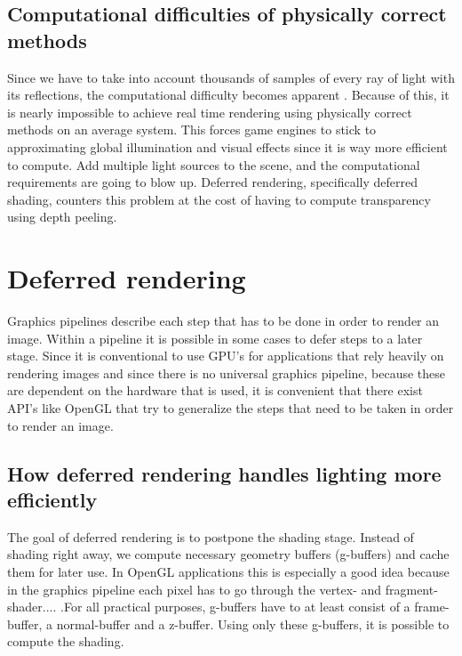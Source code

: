 \documentclass{ACGSeminar}
\begin{document}
	\subsection{Computational difficulties of physically correct methods}
	Since we have to take into account thousands of samples of every ray of light with its reflections, the computational difficulty becomes apparent \cite{DST}. Because of this, it is nearly impossible to achieve real time rendering using physically correct methods on an average system. This forces game engines to stick to approximating global illumination and visual effects since it is way more efficient to compute. Add multiple light sources to the scene, and the computational requirements are going to blow up. Deferred rendering, specifically deferred shading, counters this problem at the cost of having to compute transparency using depth peeling.

\section{Deferred rendering}
	Graphics pipelines describe each step that has to be done in order to render an image. Within a pipeline it is possible in some cases to defer steps to a later stage. Since it is conventional to use GPU's for applications that rely heavily on rendering images and since there is no universal graphics pipeline, because these are dependent on the hardware that is used, it is convenient that there exist API's like OpenGL that try to generalize the steps that need to be taken in order to render an image.
	\subsection{How deferred rendering handles lighting more efficiently}
		The goal of deferred rendering is to postpone the shading stage. %
		Instead of shading right away, we compute necessary geometry buffers (g-buffers) and cache 
		them for later use. In OpenGL applications this is especially a good idea because in the graphics pipeline each pixel has to go through the vertex- and fragment-shader.... .For all practical purposes, g-buffers have to at least consist of a frame-buffer, a normal-buffer and a z-buffer. Using only these g-buffers, it is possible to compute the shading.
\end{document}
